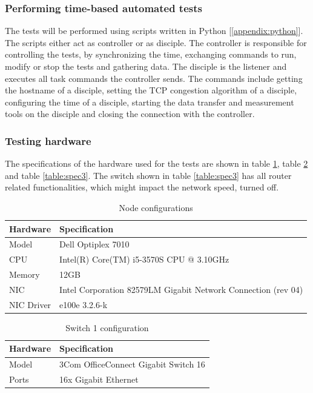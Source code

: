 \documentclass{article}
\begin{document}
		\subsubsection{Performing time-based automated tests}
		The tests will be performed using scripts written in Python [\ref{appendix:python}]. The scripts either act as controller or as disciple. The controller is responsible for controlling the tests, by synchronizing the time, exchanging commands to run, modify or stop the tests and gathering data. The disciple is the listener and executes all task commands the controller sends. The commands include getting the hostname of a disciple, setting the TCP congestion algorithm of a disciple, configuring the time of a disciple, starting the data transfer and measurement tools on the disciple and closing the connection with the controller.

		\subsubsection{Testing hardware}
		The specifications of the hardware used for the tests are shown in table \ref{table:spec1}, table \ref{table:spec2} and table \ref{table:spec3}. The switch shown in table \ref{table:spec3} has all router related functionalities, which might impact the network speed, turned off.

		\begin{table}[H]
			\centering
			\caption{Node configurations}
			\begin{tabular}[H]{ | l | l | }
			\hline
			\textbf{Hardware} & \textbf{Specification} \\
			\hline  Model & Dell Optiplex 7010\\
			\hline  CPU & Intel(R) Core(TM) i5-3570S CPU @ 3.10GHz\\
			\hline  Memory & 12GB\\
			\hline  NIC & Intel Corporation 82579LM Gigabit Network Connection (rev 04)\\
			\hline	NIC Driver & e100e 3.2.6-k\\
			\hline
			\end{tabular}
			\label{table:spec1}
		\end{table}

		\begin{table}[H]
			\centering
			\caption{Switch 1 configuration}
			\begin{tabular}[H]{ | l | l | }
			\hline
			\textbf{Hardware} & \textbf{Specification} \\
			\hline  Model & 3Com OfficeConnect Gigabit Switch 16\\
			\hline  Ports & 16x Gigabit Ethernet\\
			\hline
			\end{tabular}
			\label{table:spec2}
		\end{table}
		
\end{document}
